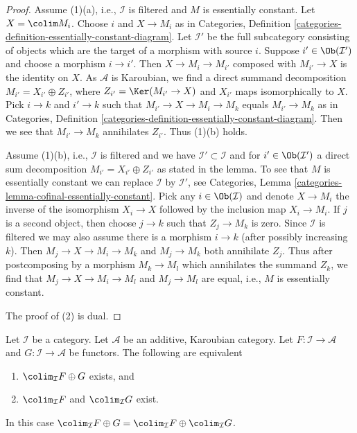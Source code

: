 \begin{proof}
Assume (1)(a), i.e., $\mathcal{I}$ is filtered and $M$ is essentially
constant. Let $X = \colim M_i$. Choose $i$ and $X \to M_i$ as in
Categories, Definition
\ref{categories-definition-essentially-constant-diagram}.
Let $\mathcal{I}'$ be the full subcategory consisting of objects
which are the target of a morphism with source $i$.
Suppose $i' \in \Ob(\mathcal{I}')$ and choose a morphism $i \to i'$.
Then $X \to M_i \to M_{i'}$ composed with $M_{i'} \to X$ is the identity
on $X$. As $\mathcal{A}$ is Karoubian, we find a direct summand
decomposition $M_{i'} = X_{i'} \oplus Z_{i'}$, where
$Z_{i'} = \Ker(M_{i'} \to X)$ and $X_{i'}$ maps isomorphically to $X$.
Pick $i \to k$ and $i' \to k$ such that $M_{i'} \to X \to M_i \to M_k$
equals $M_{i'} \to M_k$ as in Categories, Definition
\ref{categories-definition-essentially-constant-diagram}.
Then we see that $M_{i'} \to M_k$ annihilates $Z_{i'}$.
Thus (1)(b) holds.

\medskip\noindent
Assume (1)(b), i.e., $\mathcal{I}$ is filtered and we have
$\mathcal{I}' \subset \mathcal{I}$ and for $i' \in \Ob(\mathcal{I}')$
a direct sum decomposition $M_{i'} = X_{i'} \oplus Z_{i'}$
as stated in the lemma. To see that $M$ is essentially constant
we can replace $\mathcal{I}$ by $\mathcal{I}'$, see
Categories, Lemma \ref{categories-lemma-cofinal-essentially-constant}.
Pick any $i \in \Ob(\mathcal{I})$
and denote $X \to M_i$ the inverse of the isomorphism $X_i \to X$
followed by the inclusion map $X_i \to M_i$. If $j$ is
a second object, then choose $j \to k$ such that $Z_j \to M_k$ is
zero. Since $\mathcal{I}$ is filtered we may also assume there is
a morphism $i \to k$ (after possibly increasing $k$). Then
$M_j \to X \to M_i \to M_k$ and $M_j \to M_k$ both annihilate $Z_j$.
Thus after postcomposing by a morphism $M_k \to M_l$ which annihilates
the summand $Z_k$, we find that $M_j \to X \to M_i \to M_l$ and
$M_j \to M_l$ are equal, i.e., $M$ is essentially constant.

\medskip\noindent
The proof of (2) is dual.
\end{proof}

\begin{lemma}
\label{lemma-direct-sum-from-product-colimit}
Let $\mathcal{I}$ be a category. Let $\mathcal{A}$ be an additive, Karoubian
category. Let $F : \mathcal{I} \to \mathcal{A}$ and
$G : \mathcal{I} \to \mathcal{A}$ be functors. The following are equivalent
\begin{enumerate}
\item $\colim_\mathcal{I} F \oplus G$ exists, and
\item $\colim_\mathcal{I} F$ and $\colim_\mathcal{I} G$ exist.
\end{enumerate}
In this case $\colim_\mathcal{I} F \oplus G =
\colim_\mathcal{I} F \oplus \colim_\mathcal{I} G$.
\end{lemma}

